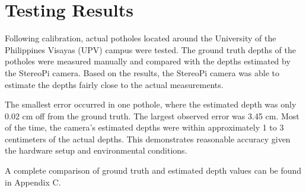 \section{Testing Results}

Following calibration, actual potholes located around the University of the Philippines Visayas (UPV) campus were tested. The ground truth depths of the potholes were measured manually and compared with the depths estimated by the StereoPi camera. Based on the results, the StereoPi camera was able to estimate the depths fairly close to the actual measurements. 

The smallest error occurred in one pothole, where the estimated depth was only 0.02 cm off from the ground truth. The largest observed error was 3.45 cm. Most of the time, the camera’s estimated depths were within approximately 1 to 3 centimeters of the actual depths. This demonstrates reasonable accuracy given the hardware setup and environmental conditions. 

A complete comparison of ground truth and estimated depth values can be found in Appendix C.



